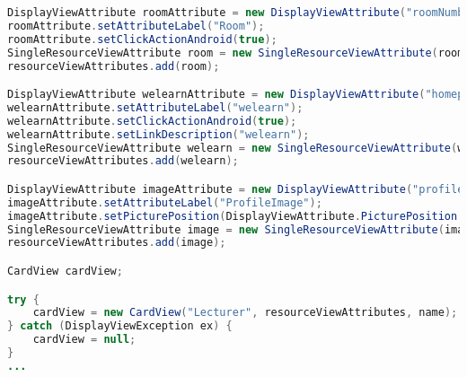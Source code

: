 \begin{lstlisting}[label=lst:cardview_impl,
language=java,
firstnumber=1,
caption=Erstellung einer \textit{CardView}.]
DisplayViewAttribute roomAttribute = new DisplayViewAttribute("roomNumber", ViewAttribute.AttributeType.HOME);
roomAttribute.setAttributeLabel("Room");
roomAttribute.setClickActionAndroid(true);
SingleResourceViewAttribute room = new SingleResourceViewAttribute(roomAttribute);
resourceViewAttributes.add(room);

DisplayViewAttribute welearnAttribute = new DisplayViewAttribute("homepage", ViewAttribute.AttributeType.URL);
welearnAttribute.setAttributeLabel("welearn");
welearnAttribute.setClickActionAndroid(true);
welearnAttribute.setLinkDescription("welearn");
SingleResourceViewAttribute welearn = new SingleResourceViewAttribute(welearnAttribute);
resourceViewAttributes.add(welearn);

DisplayViewAttribute imageAttribute = new DisplayViewAttribute("profileImageUrl", ViewAttribute.AttributeType.PICTURE);
imageAttribute.setAttributeLabel("ProfileImage");
imageAttribute.setPicturePosition(DisplayViewAttribute.PicturePosition.LEFT);
SingleResourceViewAttribute image = new SingleResourceViewAttribute(imageAttribute);
resourceViewAttributes.add(image);

CardView cardView;

try {
	cardView = new CardView("Lecturer", resourceViewAttributes, name);
} catch (DisplayViewException ex) {
	cardView = null;
}
...
\end{lstlisting}